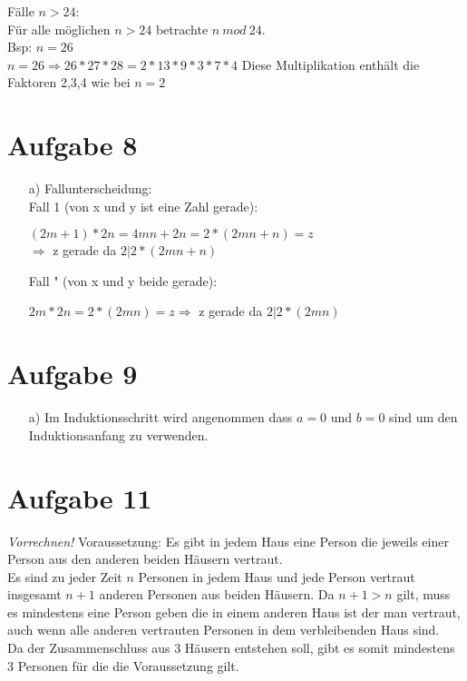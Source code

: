 \documentclass[paper = a4, ngerman]{scrartcl}
\begin{document}
\begin{itemize}
			Fälle $n>24$:\\
				Für alle möglichen $n>24$ betrachte $n\ mod\ 24$.\\
				Bsp: $n=26$\\
				$n=26 \Rightarrow 26*27*28 = 2*13*9*3*7*4$
				Diese Multiplikation enthält die Faktoren 2,3,4 wie bei $n=2$
		\end{itemize}
	
	
	\section*{Aufgabe 8}
		\begin{itemize}
			\item[a)] Fallunterscheidung:\\
			Fall 1 (von x und y ist eine Zahl gerade):
			\begin{center}
				$(2m + 1) * 2n = 4mn + 2n = 2*(2mn + n) = z $\\$\Rightarrow$ z gerade da $2|2*(2mn + n)$
			\end{center}
			Fall " (von x und y beide gerade):
			\begin{center}
				$2m * 2n = 2*(2mn) = z \Rightarrow$ z gerade da $2|2*(2mn)$
			\end{center}
		\end{itemize}
	
	
	\section*{Aufgabe 9}
		\begin{itemize}
			\item[a)] Im Induktionsschritt wird angenommen dass $a=0$ und $b=0$ sind um den Induktionsanfang zu verwenden.
		\end{itemize}
	

\pagebreak
	\section*{Aufgabe 11}
		\textit{Vorrechnen!}
		Voraussetzung: Es gibt in jedem Haus eine Person die jeweils einer Person aus den anderen beiden Häusern vertraut.\\
		Es sind zu jeder Zeit $n$ Personen in jedem Haus und jede Person vertraut insgesamt $n+1$ anderen Personen aus beiden Häusern. Da $n+1 > n$ gilt, muss es mindestens eine Person geben die in einem anderen Haus ist der man vertraut, auch wenn alle anderen vertrauten Personen in dem verbleibenden Haus sind.\\
		Da der Zusammenschluss aus 3 Häusern entstehen soll, gibt es somit mindestens 3 Personen für die die Voraussetzung gilt.
\end{document}
